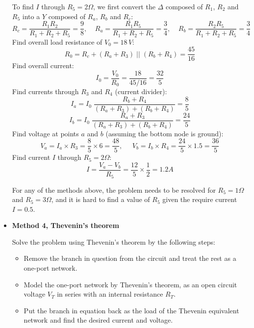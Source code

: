 \documentclass{article}
\begin{document}
\begin{itemize}
To find $I$ through $R_5=2\Omega$, we first convert the $\Delta$ 
composed of $R_1$, $R_2$ and $R_5$ into a $Y$ composed of $R_a$, 
$R_b$ and $R_c$:
\begin{equation} 
  R_c=\frac{R_1R_2}{R_1+R_2+R_5}=\frac{9}{8},\;\;\;\;
  R_a=\frac{R_1R_5}{R_1+R_2+R_5}=\frac{3}{4},\;\;\;\;
  R_b=\frac{R_2R_5}{R_1+R_2+R_5}=\frac{3}{4}
\end{equation}
Find overall load resistance of $V_0=18\,V$:
\begin{equation}
  R_0=R_c+(R_a+R_3) \;||\; (R_b+R_4)=\frac{45}{16}	
\end{equation}
Find overall current:
\begin{equation}
  I_0=\frac{V_0}{R_0}=\frac{18}{45/16}=\frac{32}{5}
\end{equation}
Find currents through $R_3$ and $R_4$ (current divider):
\begin{equation} 
  I_a=I_0\;\frac{R_b+R_4}{(R_a+R_3)+(R_b+R_4)}=\frac{8}{5} 
\end{equation}
\begin{equation} 
  I_b=I_0\;\frac{R_a+R_3}{(R_a+R_3)+(R_b+R_4)}=\frac{24}{5}
\end{equation}
Find voltage at points $a$ and $b$ (assuming the bottom node
is ground):
\begin{equation}
  V_a=I_a \times R_3=\frac{8 }{5} \times 6=\frac{48}{5},\;\;\;\;\;
  V_b=I_b \times R_4=\frac{24}{5} \times 1.5=\frac{36}{5}	
\end{equation}
Find current $I$ through $R_5=2\Omega$:
\begin{equation}
  I=\frac{V_a-V_b}{R_5}=\frac{12}{5}\times \frac{1}{2}=1.2A
\end{equation}

For any of the methods above, the problem needs to be resolved
for $R_5=1\Omega$ and $R_5=3\Omega$, and it is hard to find a 
value of $R_5$ given the require current $I=0.5$.


\item {\bf Method 4, Thevenin's theorem}

Solve the problem using Thevenin's theorem by the following steps:
\begin{itemize}
\item Remove the branch in question from the circuit and treat the rest as
  a one-port network.
\item Model the one-port network by Thevenin's theorem, as an open circuit 
  voltage $V_T$ in series with an internal resistance $R_T$.
\item Put the branch in equation back as the load of the Thevenin equivalent
  network and find the desired current and voltage.
\end{itemize}


\end{itemize}
\end{document}

